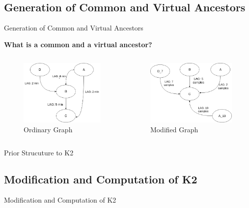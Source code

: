 \subsection{Generation of Common and Virtual Ancestors}
\begin{frame}{Generation of Common and Virtual Ancestors}

\textbf{What is a common and a virtual ancestor?}

\begin{columns}
        \begin{figure}
            \includegraphics[width=\textwidth]{figuras/virtualNodes.png}
            \caption{Ordinary Graph}
        \end{figure}
        \begin{figure}
            \includegraphics[width=\textwidth]{figuras/cVirt.png}
            \caption{Modified Graph}
        \end{figure}

\end{columns}
\end{frame}

\begin{frame}{Prior Strucuture to K2}
    
\end{frame}

\subsection{Modification and Computation of K2}
\begin{frame}{Modification and Computation of K2}
    
\end{frame}
